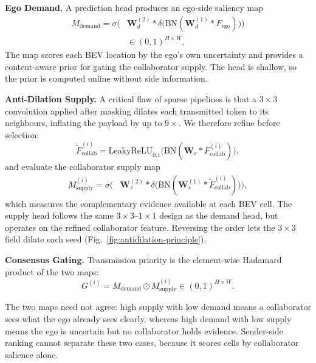 \noindent\textbf{Ego Demand.}
A prediction head produces an ego-side saliency map
\begin{equation}
\begin{split}
  M_{\text{demand}} = \sigma\Big(&\mathbf{W}_d^{(2)} * \delta\big(\mathrm{BN}(\mathbf{W}_d^{(1)} * F_{\text{ego}})\big)\Big)\\
  &\in (0,1)^{H\times W},
\end{split}
\label{eq:demand}
\end{equation}
The map scores each BEV location by the ego's own uncertainty and provides a content-aware prior for gating the collaborator supply. The head is shallow, so the prior is computed online without side information.

\noindent\textbf{Anti-Dilation Supply.}
A critical flaw of sparse pipelines is that a $3{\times}3$ convolution applied after masking dilates each transmitted token to its neighbours, inflating the payload by up to $9\times$. We therefore refine before selection:
\begin{equation}
  \widetilde{F}_{\text{collab}}^{(i)} = \mathrm{LeakyReLU}_{0.1}\!\big(\mathrm{BN}(\mathbf{W}_r * F_{\text{collab}}^{(i)})\big),
\end{equation}
and evaluate the collaborator supply map
\begin{equation}
\begin{split}
  M_{\text{supply}}^{(i)} = \sigma\Big(&\mathbf{W}_s^{(2)} * \delta\big(\mathrm{BN}(\mathbf{W}_s^{(1)} * \widetilde{F}_{\text{collab}}^{(i)})\big)\Big),
\end{split}
\label{eq:supply}
\end{equation}
which measures the complementary evidence available at each BEV cell. The supply head follows the same $3{\times}3$--$1{\times}1$ design as the demand head, but operates on the refined collaborator feature. Reversing the order lets the $3{\times}3$ field dilate each seed (Fig.~\ref{fig:antidilation-principle}).

\noindent\textbf{Consensus Gating.}
Transmission priority is the element-wise Hadamard product of the two maps:
\begin{equation}
  G^{(i)} = M_{\text{demand}} \odot M_{\text{supply}}^{(i)} \in (0,1)^{H\times W}.
  \label{eq:gating}
\end{equation}


The two maps need not agree: high supply with low demand means a collaborator sees what the ego already sees clearly, whereas high demand with low supply means the ego is uncertain but no collaborator holds evidence. Sender-side ranking cannot separate these two cases, because it scores cells by collaborator salience alone.

